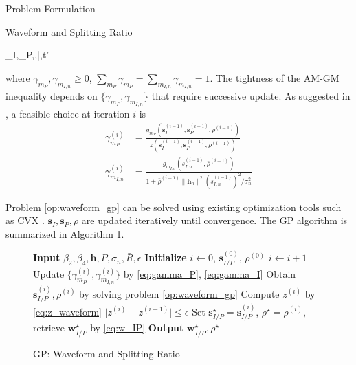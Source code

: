 \documentclass[journal]{IEEEtran}
\begin{document}
\begin{section}{Problem Formulation}
\begin{subsection}{Waveform and Splitting Ratio}
\begin{mini}
				{\boldsymbol{s}_I,_P,\rho,\bar{\rho},t'}{}{\label{op:waveform_gp}}{}
			\end{mini}
			where $\gamma_{m_P},\gamma_{m_{I,n}} \ge 0$, $\sum_{m_P}\gamma_{m_P}=\sum_{m_{I,n}}\gamma_{m_{I,n}}=1$. The tightness of the AM-GM inequality depends on $\{\gamma_{m_P},\gamma_{m_{I,n}}\}$ that require successive update. As suggested in \cite{Clerckx2018b}, a feasible choice at iteration $i$ is
			\begin{align}
				\gamma_{m_P}^{(i)} & = \frac{g_{m_P}(\boldsymbol{s}_I^{(i-1)},\boldsymbol{s}_P^{(i-1)},\rho^{(i-1)})}{z(\boldsymbol{s}_I^{(i-1)},\boldsymbol{s}_P^{(i-1)},\rho^{(i-1)})}\label{eq:gamma_P}\\
				\gamma_{m_{I,n}}^{(i)} & = \frac{g_{m_{I,n}}(s_{I,n}^{(i-1)},\bar{\rho}^{(i-1)})}{1+{\bar{\rho}^{(i-1)}\lVert{\boldsymbol{h}_n}\rVert^2 (s_{I,n}^{(i-1)})^2}/{\sigma_n^2}}\label{eq:gamma_I}
			\end{align}

			Problem \ref{op:waveform_gp} can be solved using existing optimization tools such as CVX \cite{Grant2013}. $\boldsymbol{s}_I,\boldsymbol{s}_P,\rho$ are updated iteratively until convergence. The GP algorithm is summarized in Algorithm \ref{al:waveform}.
			\begin{figure}[!t]
				\begin{algorithm}[H]
					\forcealgorithm
					\caption{GP: Waveform and Splitting Ratio}
					\label{al:waveform}
					\begin{algorithmic}[1]
						\State \textbf{Input} $\beta_2,\beta_4,\boldsymbol{h},P,\sigma_n,\bar{R},\epsilon$
						\State \textbf{Initialize} $i \gets 0$, $\boldsymbol{s}_{I/P}^{(0)}$, $\rho^{(0)}$
						\Repeat
							\State $i \gets i + 1$
							\State Update $\{\gamma_{m_P}^{(i)},\gamma_{m_{I,n}}^{(i)}\}$ by \ref{eq:gamma_P}, \ref{eq:gamma_I}
							\State Obtain $\boldsymbol{s}_{I/P}^{(i)},\rho^{(i)}$ by solving problem \ref{op:waveform_gp}
							\State Compute $z^{(i)}$ by \ref{eq:z_waveform}
						\Until $\lvert z^{(i)} - z^{(i-1)} \rvert \le \epsilon$
						\State Set $\boldsymbol{s}_{I/P}^{\star}=\boldsymbol{s}_{I/P}^{(i)}$, $\rho^{\star}=\rho^{(i)}$, retrieve $\boldsymbol{w}_{I/P}^{\star}$ by \ref{eq:w_IP}
						\State \textbf{Output} $\boldsymbol{w}_{I/P}^{\star}, \rho^{\star}$
					\end{algorithmic}
				\end{algorithm}
			\end{figure}
		\end{subsection}



\end{section}
\end{document}
